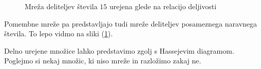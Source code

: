 \documentclass[a4paper]{article}
\begin{document}
\begin{figure}
\centering
{}
\caption{Mreža deliteljev števila $15$ urejena glede na relacijo deljivosti}
\label{im:divisors_of_30_hasse_diagram}
\end{figure}

Pomembne mreže pa predstavljajo tudi mreže deliteljev posameznega naravnega števila. To lepo vidmo na sliki (\ref{im:divisors_of_30_hasse_diagram}).

Delno urejene množice lahko predstavimo zgolj s Hassejevim diagramom. Poglejmo si nekaj množic, ki niso mreže in razložimo zakaj ne.
\end{document}
